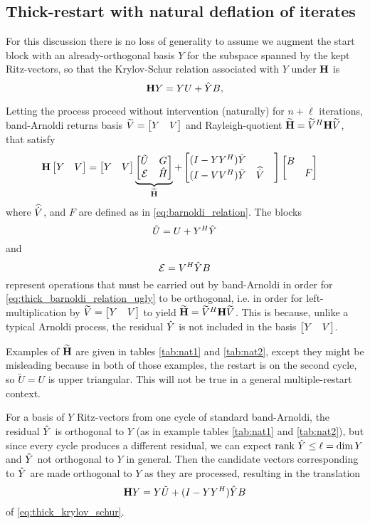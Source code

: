 \subsection{Thick-restart with natural deflation of iterates}
For this discussion there is no loss of generality to assume we augment the start block with an already-orthogonal basis $Y$ for the subspace spanned by the kept Ritz-vectors, so that the  Krylov-Schur relation associated with $Y$ under $\textbf{\textup{H}}$ is 
\begin{equation}
\textbf{\textup{H}} Y = Y U +  \hat{Y} B,
\label{eq:thick_krylov_schur}
\end{equation}


  Letting the process proceed without intervention (naturally) for $n+\ell$ iterations, band-Arnoldi returns basis $\widetilde{V} = \begin{bmatrix} Y&V\end{bmatrix}$ and Rayleigh-quotient $\widetilde{\textbf{\textup{H}}} = \widetilde{V}^H \textbf{\textup{H}} \widetilde{V}$, that satisfy  
\begin{align}
\textbf{\textup{H}} \begin{bmatrix} Y&V\end{bmatrix} &= \begin{bmatrix} Y&V\end{bmatrix} \underbrace{\begin{bmatrix} \tilde{U} & G \\ \cal{E}&\hat{H}\end{bmatrix}}_{\widetilde{\textbf{\textup{H}}}} 
+\begin{bmatrix} (I-YY^H)\hat{Y} & & \\
		(I-VV^H)\hat{Y} & \widehat{\dot{V}} \end{bmatrix} 
\begin{bmatrix} B&\\&F\end{bmatrix}
\label{eq:thick_barnoldi_relation_ugly} 
\end{align}
 where $\widehat{\dot{V}}$, and $F$ are defined as in \eqref{eq:barnoldi_relation}. 
The blocks 
\begin{equation}
\tilde{U}=U+Y^H\hat{Y}
\end{equation}
and 
 \begin{equation}
\mathcal{E}=V^H\hat{Y} B
\label{eq:VHYh}
\end{equation}
 represent operations that must be carried out by band-Arnoldi in order for  \eqref{eq:thick_barnoldi_relation_ugly} to be orthogonal, i.e. in order for left-multiplication by $\widetilde{V} = \begin{bmatrix} Y&V\end{bmatrix}$ to yield $\widetilde{\textbf{\textup{H}}} = \widetilde{V}^H \textbf{\textup{H}} \widetilde{V}$.   This is because, unlike a typical Arnoldi process, the residual $\hat{Y}$ is not included in the basis $\begin{bmatrix} Y&V\end{bmatrix}$.
  
Examples of $\widetilde{\textbf{\textup{H}}}$ are given in tables \ref{tab:nat1} and \ref{tab:nat2}, except they might be misleading because in both of those examples, the restart is on the second cycle, so $\tilde{U} = U$ is upper triangular.  This will not be true in a general multiple-restart context.  


 For a basis of $Y$ Ritz-vectors from  one cycle of standard band-Arnoldi, the residual $\hat{Y}$ is orthogonal to $Y$ (as in example tables \ref{tab:nat1} and \ref{tab:nat2}), but since every cycle produces a different residual, we can expect $\text{rank } \hat{Y}  \leq \ell = \dim Y$ and $\hat{Y}$ not orthogonal to $Y$ in  general.  Then the candidate vectors corresponding to $\hat{Y}$ are made orthogonal to $Y$ as they are processed, resulting in the translation  
\begin{equation}
\textbf{\textup{H}} Y = Y \tilde{U} +  (I-YY^H)\hat{Y} B
\label{eq:band_deflated_decomp_orth}
\end{equation}
of \eqref{eq:thick_krylov_schur}.

